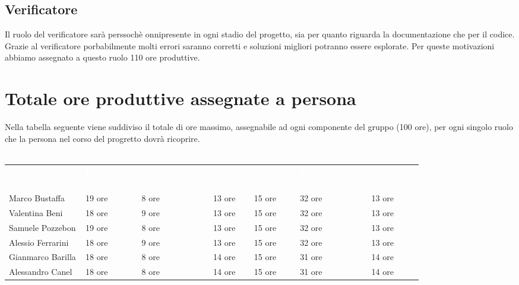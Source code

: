 \subsection{Verificatore}
Il ruolo del verificatore sarà perssochè onnipresente in ogni stadio del progetto, sia per quanto riguarda la documentazione che per il codice. Grazie al verificatore porbabilmente molti errori saranno corretti
e soluzioni migliori potranno essere esplorate. Per queste motivazioni abbiamo assegnato a questo ruolo 110 ore produttive.

\section{Totale ore produttive assegnate a persona}
Nella tabella seguente viene suddiviso il totale di ore massimo, assegnabile ad ogni componente del gruppo
(100 ore), per ogni singolo ruolo che la persona nel corso del progretto dovrà ricoprire.\\\\
{\renewcommand{\arraystretch}{1.5}
\scriptsize
\begin{tabular}{p{0.15\linewidth}p{0.11\linewidth}p{0.14\linewidth}p{0.08\linewidth}p{0.09\linewidth}p{0.14\linewidth}p{0.10\linewidth}}
	\rowcolor[RGB]{33, 73, 50}
	\textcolor{white}{\textbf{Componente}} & \textcolor{white}{\textbf{Responsabile}} & \textcolor{white}
	{\textbf{Amministratore}} & \textcolor{white}{\textbf{Analista}} & \textcolor{white}
	{\textbf{Progettista}} & \textcolor{white}{\textbf{Programmatore}} & \textcolor{white}{\textbf{Verificatore}}\\
	\rowcolor[RGB]{216, 235, 171}
	Marco Bustaffa & 19 ore & 8 ore & 13 ore & 15 ore & 32 ore & 13 ore        	\\
	\rowcolor[RGB]{233, 245, 206}
	Valentina Beni & 18 ore & 9 ore & 13 ore & 15 ore & 32 ore & 13 ore        	\\
	\rowcolor[RGB]{216, 235, 171}
	Samuele Pozzebon & 19 ore & 8 ore & 13 ore & 15 ore & 32 ore & 13 ore      	\\
    \rowcolor[RGB]{233, 245, 206}
	Alessio Ferrarini & 18 ore & 9 ore & 13 ore & 15 ore & 32 ore & 13 ore     	\\
    \rowcolor[RGB]{216, 235, 171}
	Gianmarco Barilla & 18 ore & 8 ore & 14 ore & 15 ore & 31 ore & 14 ore     	\\
    \rowcolor[RGB]{233, 245, 206}
	Alessandro Canel & 18 ore & 8 ore & 14 ore & 15 ore & 31 ore & 14 ore    	\\
\end{tabular}	
}